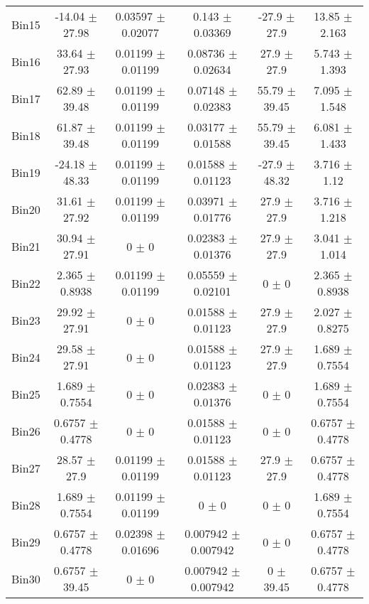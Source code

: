\begin{tabular}{@{\extracolsep{4pt}}lccccc@{}}
     Bin15 & -14.04 $\pm$ 27.98 & 0.03597 $\pm$ 0.02077 & 0.143 $\pm$ 0.03369 & -27.9 $\pm$ 27.9 & 13.85 $\pm$ 2.163 \\ 
     Bin16 & 33.64 $\pm$ 27.93 & 0.01199 $\pm$ 0.01199 & 0.08736 $\pm$ 0.02634 & 27.9 $\pm$ 27.9 & 5.743 $\pm$ 1.393 \\ 
     Bin17 & 62.89 $\pm$ 39.48 & 0.01199 $\pm$ 0.01199 & 0.07148 $\pm$ 0.02383 & 55.79 $\pm$ 39.45 & 7.095 $\pm$ 1.548 \\ 
     Bin18 & 61.87 $\pm$ 39.48 & 0.01199 $\pm$ 0.01199 & 0.03177 $\pm$ 0.01588 & 55.79 $\pm$ 39.45 & 6.081 $\pm$ 1.433 \\ 
     Bin19 & -24.18 $\pm$ 48.33 & 0.01199 $\pm$ 0.01199 & 0.01588 $\pm$ 0.01123 & -27.9 $\pm$ 48.32 & 3.716 $\pm$ 1.12 \\ 
     Bin20 & 31.61 $\pm$ 27.92 & 0.01199 $\pm$ 0.01199 & 0.03971 $\pm$ 0.01776 & 27.9 $\pm$ 27.9 & 3.716 $\pm$ 1.218 \\ 
     Bin21 & 30.94 $\pm$ 27.91 & 0 $\pm$ 0 & 0.02383 $\pm$ 0.01376 & 27.9 $\pm$ 27.9 & 3.041 $\pm$ 1.014 \\ 
     Bin22 & 2.365 $\pm$ 0.8938 & 0.01199 $\pm$ 0.01199 & 0.05559 $\pm$ 0.02101 & 0 $\pm$ 0 & 2.365 $\pm$ 0.8938 \\ 
     Bin23 & 29.92 $\pm$ 27.91 & 0 $\pm$ 0 & 0.01588 $\pm$ 0.01123 & 27.9 $\pm$ 27.9 & 2.027 $\pm$ 0.8275 \\ 
     Bin24 & 29.58 $\pm$ 27.91 & 0 $\pm$ 0 & 0.01588 $\pm$ 0.01123 & 27.9 $\pm$ 27.9 & 1.689 $\pm$ 0.7554 \\ 
     Bin25 & 1.689 $\pm$ 0.7554 & 0 $\pm$ 0 & 0.02383 $\pm$ 0.01376 & 0 $\pm$ 0 & 1.689 $\pm$ 0.7554 \\ 
     Bin26 & 0.6757 $\pm$ 0.4778 & 0 $\pm$ 0 & 0.01588 $\pm$ 0.01123 & 0 $\pm$ 0 & 0.6757 $\pm$ 0.4778 \\ 
     Bin27 & 28.57 $\pm$ 27.9 & 0.01199 $\pm$ 0.01199 & 0.01588 $\pm$ 0.01123 & 27.9 $\pm$ 27.9 & 0.6757 $\pm$ 0.4778 \\ 
     Bin28 & 1.689 $\pm$ 0.7554 & 0.01199 $\pm$ 0.01199 & 0 $\pm$ 0 & 0 $\pm$ 0 & 1.689 $\pm$ 0.7554 \\ 
     Bin29 & 0.6757 $\pm$ 0.4778 & 0.02398 $\pm$ 0.01696 & 0.007942 $\pm$ 0.007942 & 0 $\pm$ 0 & 0.6757 $\pm$ 0.4778 \\ 
     Bin30 & 0.6757 $\pm$ 39.45 & 0 $\pm$ 0 & 0.007942 $\pm$ 0.007942 & 0 $\pm$ 39.45 & 0.6757 $\pm$ 0.4778 \\ 
\hline\hline
  \end{tabular}
